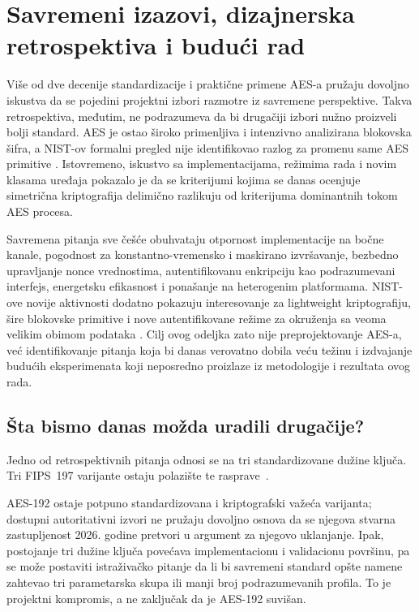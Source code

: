 \section{Savremeni izazovi, dizajnerska retrospektiva i budući rad}
\label{sec:izazovi}

Više od dve decenije standardizacije i praktične primene AES-a pružaju
dovoljno iskustva da se pojedini projektni izbori razmotre iz savremene
perspektive. Takva retrospektiva, međutim, ne podrazumeva da bi drugačiji
izbori nužno proizveli bolji standard. AES je ostao široko primenljiva i
intenzivno analizirana blokovska šifra, a NIST-ov formalni pregled nije
identifikovao razlog za promenu same AES primitive
\cite{MouhaDworkin2021AESReview}. Istovremeno, iskustvo sa implementacijama,
režimima rada i novim klasama uređaja pokazalo je da se kriterijumi kojima
se danas ocenjuje simetrična kriptografija delimično razlikuju od kriterijuma
dominantnih tokom AES procesa.

Savremena pitanja sve češće obuhvataju otpornost implementacije na bočne
kanale, pogodnost za konstantno-vremensko i maskirano izvršavanje,
bezbedno upravljanje nonce vrednostima, autentifikovanu enkripciju kao
podrazumevani interfejs, energetsku efikasnost i ponašanje na heterogenim
platformama. NIST-ove novije aktivnosti dodatno pokazuju interesovanje za
lightweight kriptografiju, šire blokovske primitive i nove autentifikovane
režime za okruženja sa veoma velikim obimom podataka
\cite{NISTSP800232,Turan2026SymmetricStandards}. Cilj ovog odeljka zato
nije preprojektovanje AES-a, već identifikovanje pitanja koja bi danas
verovatno dobila veću težinu i izdvajanje budućih eksperimenata koji
neposredno proizlaze iz metodologije i rezultata ovog rada.


\subsection{Šta bismo danas možda uradili drugačije?}

Jedno od retrospektivnih pitanja odnosi se na tri standardizovane dužine
ključa. Tri FIPS~197 varijante ostaju polazište te rasprave~\cite{NISTFIPS197Update}.

AES-192 ostaje potpuno standardizovana i
kriptografski važeća varijanta; dostupni autoritativni izvori ne pružaju
dovoljno osnova da se njegova stvarna zastupljenost 2026. godine pretvori
u argument za njegovo uklanjanje. Ipak, postojanje tri dužine ključa
povećava implementacionu i validacionu površinu, pa se može postaviti
istraživačko pitanje da li bi savremeni standard opšte namene zahtevao
tri parametarska skupa ili manji broj podrazumevanih profila. To je
projektni kompromis, a ne zaključak da je AES-192 suvišan.

